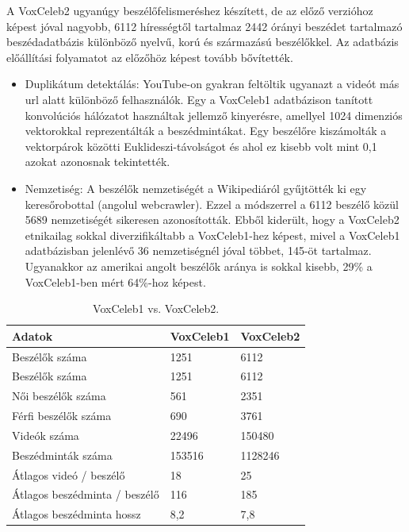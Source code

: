 A VoxCeleb2 ugyanúgy beszélőfelismeréshez készített, de az előző verzióhoz képest jóval nagyobb, 6112 hírességtől tartalmaz 2442 órányi beszédet tartalmazó beszédadatbázis különböző nyelvű, korú és származású beszélőkkel.
\newline
\newline
Az adatbázis előállítási folyamatot az előzőhöz képest tovább bővítették.
\begin{itemize}
	\item Duplikátum detektálás: YouTube-on gyakran feltöltik ugyanazt a videót más url alatt különböző felhasználók. Egy a VoxCeleb1 adatbázison tanított konvolúciós hálózatot használtak jellemző kinyerésre, amellyel 1024 dimenziós vektorokkal reprezentálták a beszédmintákat. Egy beszélőre kiszámolták a vektorpárok közötti Euklideszi-távolságot és ahol ez kisebb volt mint 0,1 azokat azonosnak tekintették.
	\item Nemzetiség: A beszélők nemzetiségét a Wikipediáról gyűjtötték ki egy keresőrobottal (angolul webcrawler). Ezzel a módszerrel a 6112 beszélő közül 5689 nemzetiségét sikeresen azonosították. Ebből kiderült, hogy a VoxCeleb2 etnikailag sokkal diverzifikáltabb a VoxCeleb1-hez képest, mivel a VoxCeleb1 adatbázisban jelenlévő 36 nemzetiségnél jóval többet, 145-öt tartalmaz. Ugyanakkor az amerikai angolt beszélők aránya is sokkal kisebb, 29\% a VoxCeleb1-ben mért 64\%-hoz képest.
\end{itemize}

\begin{table}[!ht]
	\begin{tabular}{*3l} \toprule
		\bfseries Adatok & \bfseries VoxCeleb1 & \bfseries VoxCeleb2 \\ \midrule
		Beszélők száma   & 1251 & 6112 \\
		\rowcolor{gray!10} 
		Beszélők száma   & 1251 & 6112 \\
		Női beszélők száma & 561 & 2351 \\
		\rowcolor{gray!10}
		Férfi beszélők száma & 690 & 3761 \\
		Videók száma & 22496 & 150480 \\
		\rowcolor{gray!10}
		Beszédminták száma & 153516 & 1128246 \\
		Átlagos videó / beszélő & 18 & 25 \\
		\rowcolor{gray!10}
		Átlagos beszédminta / beszélő & 116 & 185 \\
		Átlagos beszédminta hossz & 8,2 & 7,8 \\
		\bottomrule
		\hline
	\end{tabular}
	\centering
	\caption{VoxCeleb1 vs. VoxCeleb2.}
	\label{fig:voxceleb1-vs-2}
\end{table}

